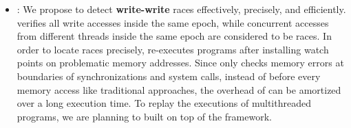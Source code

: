 \begin{itemize}




\item \DoubleTake{}:
We propose \DoubleTake{} to detect \textbf{write-write} races effectively, precisely, and efficiently.
\DoubleTake{} verifies all write accesses inside the same epoch, while 
concurrent accesses from different threads inside the same epoch are considered
to be races. In order to locate races precisely, \DoubleTake{} re-executes programs after installing 
watch points on problematic memory addresses. 
Since \DoubleTake{} only checks memory errors at boundaries of synchronizations and system calls,
instead of before every memory access like traditional approaches, 
the overhead of \DoubleTake{} can be amortized over a long execution time. 
To replay the executions of  multithreaded programs, we
are planning to built \DoubleTake{} on top of the \dthreads{} framework.
  


\end{itemize}
